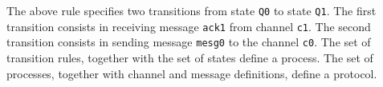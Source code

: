 The above rule specifies two transitions from  state {\tt Q0} to  state {\tt Q1}.
The first transition consists in receiving message {\tt ack1} from channel {\tt c1}.
The second transition consists in sending message {\tt mesg0} to the channel {\tt c0}.
The set of transition rules, together with the set of states define a process.
The set of processes, together with channel and message definitions, define a protocol.


